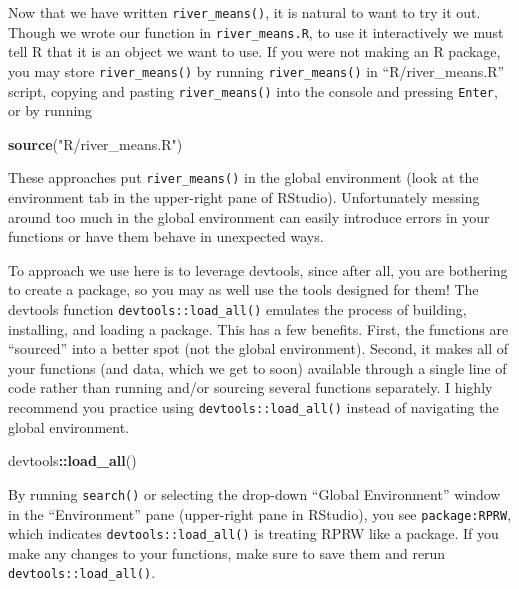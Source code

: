 \documentclass[
]{book}
\newenvironment{Shaded}{\begin{snugshade}}{\end{snugshade}}
\newcommand{\KeywordTok}[1]{\textcolor[rgb]{0.13,0.29,0.53}{\textbf{#1}}}
\newcommand{\NormalTok}[1]{#1}
\newcommand{\OperatorTok}[1]{\textcolor[rgb]{0.81,0.36,0.00}{\textbf{#1}}}
\newcommand{\StringTok}[1]{\textcolor[rgb]{0.31,0.60,0.02}{#1}}
\begin{document}
Now that we have written \texttt{river\_means()}, it is natural to want to try it out. Though we wrote our function in \texttt{river\_means.R}, to use it interactively we must tell R that it is an object we want to use. If you were not making an R package, you may store \texttt{river\_means()} by running \texttt{river\_means()} in ``R/river\_means.R'' script, copying and pasting \texttt{river\_means()} into the console and pressing \texttt{Enter}, or by running

\begin{Shaded}
\begin{Highlighting}[]
\KeywordTok{source}\NormalTok{(}\StringTok{"R/river_means.R"}\NormalTok{)}
\end{Highlighting}
\end{Shaded}

These approaches put \texttt{river\_means()} in the global environment (look at the environment tab in the upper-right pane of RStudio). Unfortunately messing around too much in the global environment can easily introduce errors in your functions or have them behave in unexpected ways.

To approach we use here is to leverage devtools, since after all, you are bothering to create a package, so you may as well use the tools designed for them! The devtools function \texttt{devtools::load\_all()} emulates the process of building, installing, and loading a package. This has a few benefits. First, the functions are ``sourced'' into a better spot (not the global environment). Second, it makes all of your functions (and data, which we get to soon) available through a single line of code rather than running and/or sourcing several functions separately. I highly recommend you practice using \texttt{devtools::load\_all()} instead of navigating the global environment.

\begin{Shaded}
\begin{Highlighting}[]
\NormalTok{devtools}\OperatorTok{::}\KeywordTok{load_all}\NormalTok{()}
\end{Highlighting}
\end{Shaded}

By running \texttt{search()} or selecting the drop-down ``Global Environment'' window in the ``Environment'' pane (upper-right pane in RStudio), you see \texttt{package:RPRW}, which indicates \texttt{devtools::load\_all()} is treating RPRW like a package. If you make any changes to your functions, make sure to save them and rerun \texttt{devtools::load\_all()}.
\end{document}
